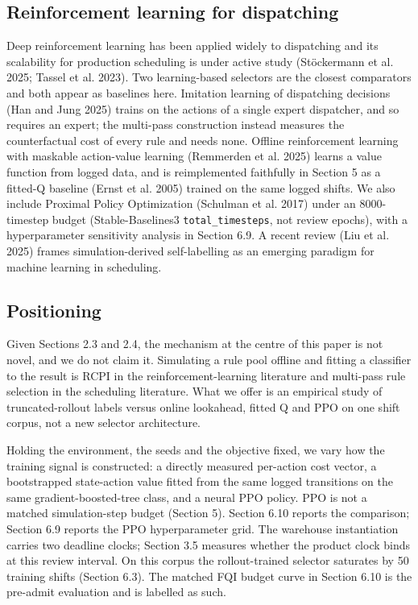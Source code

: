 \documentclass[review,3p,times]{elsarticle}
\newcounter{none}
\theoremstyle{definition}
\begin{document}
\subsection{Reinforcement learning for
dispatching}\label{reinforcement-learning-for-dispatching}

Deep reinforcement learning has been applied widely to dispatching and
its scalability for production scheduling is under active study
(Stöckermann et al. 2025; Tassel et al. 2023). Two learning-based
selectors are the closest comparators and both appear as baselines here.
Imitation learning of dispatching decisions (Han and Jung 2025) trains
on the actions of a single expert dispatcher, and so requires an expert;
the multi-pass construction instead measures the counterfactual cost of
every rule and needs none. Offline reinforcement learning with maskable
action-value learning (Remmerden et al. 2025) learns a value function
from logged data, and is reimplemented faithfully in Section 5 as a
fitted-Q baseline (Ernst et al. 2005) trained on the same logged shifts.
We also include Proximal Policy Optimization (Schulman et al. 2017)
under an 8000-timestep budget (Stable-Baselines3
\texttt{total\_timesteps}, not review epochs), with a hyperparameter
sensitivity analysis in Section 6.9. A recent review (Liu et al. 2025)
frames simulation-derived self-labelling as an emerging paradigm for
machine learning in scheduling.

\subsection{Positioning}\label{positioning}

Given Sections 2.3 and 2.4, the mechanism at the centre of this paper is
not novel, and we do not claim it. Simulating a rule pool offline and
fitting a classifier to the result is RCPI in the reinforcement-learning
literature and multi-pass rule selection in the scheduling literature.
What we offer is an empirical study of truncated-rollout labels versus
online lookahead, fitted Q and PPO on one shift corpus, not a new
selector architecture.

Holding the environment, the seeds and the objective fixed, we vary how
the training signal is constructed: a directly measured per-action cost
vector, a bootstrapped state-action value fitted from the same logged
transitions on the same gradient-boosted-tree class, and a neural PPO
policy. PPO is not a matched simulation-step budget (Section 5). Section
6.10 reports the comparison; Section 6.9 reports the PPO hyperparameter
grid. The warehouse instantiation carries two deadline clocks; Section
3.5 measures whether the product clock binds at this review interval. On
this corpus the rollout-trained selector saturates by 50 training shifts
(Section 6.3). The matched FQI budget curve in Section 6.10 is the
pre-admit evaluation and is labelled as such.
\end{document}
